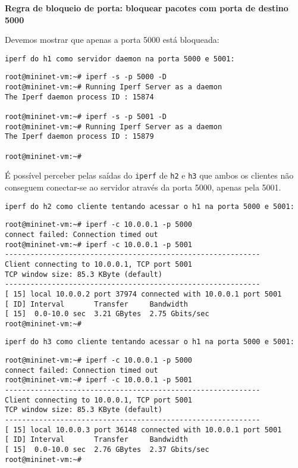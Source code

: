 \documentclass[12pt,letterpaper]{article}
\begin{document}
\textbf{Regra de bloqueio de porta: bloquear pacotes com porta de destino 5000}

Devemos mostrar que apenas a porta 5000 está bloqueada:

\begin{verbatim}
iperf do h1 como servidor daemon na porta 5000 e 5001:
\end{verbatim}

\begin{tiny}
\begin{verbatim}
root@mininet-vm:~# iperf -s -p 5000 -D
root@mininet-vm:~# Running Iperf Server as a daemon
The Iperf daemon process ID : 15874

root@mininet-vm:~# iperf -s -p 5001 -D
root@mininet-vm:~# Running Iperf Server as a daemon
The Iperf daemon process ID : 15879

root@mininet-vm:~# 
\end{verbatim}
\end{tiny}

É possível perceber pelas saídas do \texttt{iperf} de \texttt{h2} e \texttt{h3} que ambos os clientes não conseguem conectar-se ao servidor através da porta 5000, apenas pela 5001.

\begin{verbatim}
iperf do h2 como cliente tentando acessar o h1 na porta 5000 e 5001:
\end{verbatim}

\begin{tiny}
\begin{verbatim}
root@mininet-vm:~# iperf -c 10.0.0.1 -p 5000
connect failed: Connection timed out
root@mininet-vm:~# iperf -c 10.0.0.1 -p 5001
------------------------------------------------------------
Client connecting to 10.0.0.1, TCP port 5001
TCP window size: 85.3 KByte (default)
------------------------------------------------------------
[ 15] local 10.0.0.2 port 37974 connected with 10.0.0.1 port 5001
[ ID] Interval       Transfer     Bandwidth
[ 15]  0.0-10.0 sec  3.21 GBytes  2.75 Gbits/sec
root@mininet-vm:~# 
\end{verbatim}
\end{tiny}

\begin{verbatim}
iperf do h3 como cliente tentando acessar o h1 na porta 5000 e 5001:
\end{verbatim}

\begin{tiny}
\begin{verbatim}
root@mininet-vm:~# iperf -c 10.0.0.1 -p 5000
connect failed: Connection timed out
root@mininet-vm:~# iperf -c 10.0.0.1 -p 5001
------------------------------------------------------------
Client connecting to 10.0.0.1, TCP port 5001
TCP window size: 85.3 KByte (default)
------------------------------------------------------------
[ 15] local 10.0.0.3 port 36148 connected with 10.0.0.1 port 5001
[ ID] Interval       Transfer     Bandwidth
[ 15]  0.0-10.0 sec  2.76 GBytes  2.37 Gbits/sec
root@mininet-vm:~# 
\end{verbatim}
\end{tiny}
\end{document}

